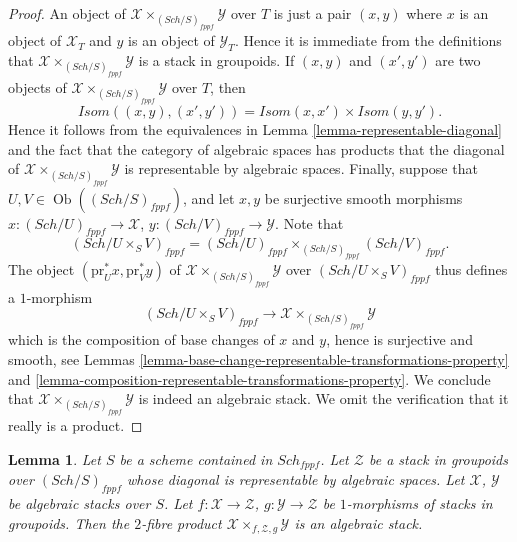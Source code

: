 \documentclass{stacks-project}
\theoremstyle{plain}
\newtheorem{lemma}[subsection]{Lemma}
\theoremstyle{definition}
\theoremstyle{remark}
\numberwithin{equation}{subsection}
\def\Sch{\mathit{Sch}}
\def\Ob{\mathop{\mathrm{Ob}}\nolimits}
\begin{document}
\begin{proof}
An object of $\mathcal{X} \times_{(\Sch/S)_{fppf}} \mathcal{Y}$
over $T$ is just a pair $(x, y)$ where $x$ is an object of $\mathcal{X}_T$
and $y$ is an object of $\mathcal{Y}_T$. Hence it is immediate from
the definitions that
$\mathcal{X} \times_{(\Sch/S)_{fppf}} \mathcal{Y}$ is a
stack in groupoids. If $(x, y)$ and $(x', y')$ are
two objects of $\mathcal{X} \times_{(\Sch/S)_{fppf}} \mathcal{Y}$
over $T$, then
$$
\mathit{Isom}((x, y), (x', y')) =
\mathit{Isom}(x, x') \times \mathit{Isom}(y, y').
$$
Hence it follows from the equivalences in
Lemma \ref{lemma-representable-diagonal}
and the fact that the category of algebraic spaces has products
that the diagonal of $\mathcal{X} \times_{(\Sch/S)_{fppf}} \mathcal{Y}$
is representable by algebraic spaces.
Finally, suppose that $U, V \in \Ob((\Sch/S)_{fppf})$,
and let $x, y$ be surjective smooth morphisms
$x : (\Sch/U)_{fppf} \to \mathcal{X}$,
$y : (\Sch/V)_{fppf} \to \mathcal{Y}$.
Note that
$$
(\Sch/U \times_S V)_{fppf} =
(\Sch/U)_{fppf}
\times_{(\Sch/S)_{fppf}} (\Sch/V)_{fppf}.
$$
The object $(\text{pr}_U^*x, \text{pr}_V^*y)$ of
$\mathcal{X} \times_{(\Sch/S)_{fppf}} \mathcal{Y}$ over
$(\Sch/U \times_S V)_{fppf}$ thus defines a $1$-morphism
$$
(\Sch/U \times_S V)_{fppf}
\longrightarrow
\mathcal{X} \times_{(\Sch/S)_{fppf}} \mathcal{Y}
$$
which is the composition of base changes of $x$ and $y$, hence
is surjective and smooth, see
Lemmas \ref{lemma-base-change-representable-transformations-property} and
\ref{lemma-composition-representable-transformations-property}.
We conclude that $\mathcal{X} \times_{(\Sch/S)_{fppf}} \mathcal{Y}$
is indeed an algebraic stack. We omit the verification that it
really is a product.
\end{proof}

\begin{lemma}
\label{lemma-2-fibre-product-general}
Let $S$ be a scheme contained in $\Sch_{fppf}$.
Let $\mathcal{Z}$ be a stack in groupoids over $(\Sch/S)_{fppf}$
whose diagonal is representable by algebraic spaces.
Let $\mathcal{X}$, $\mathcal{Y}$ be algebraic stacks over $S$.
Let $f : \mathcal{X} \to \mathcal{Z}$, $g : \mathcal{Y} \to \mathcal{Z}$
be $1$-morphisms of stacks in groupoids. Then the $2$-fibre product
$\mathcal{X} \times_{f, \mathcal{Z}, g} \mathcal{Y}$ is an algebraic stack.
\end{lemma}
\end{document}
